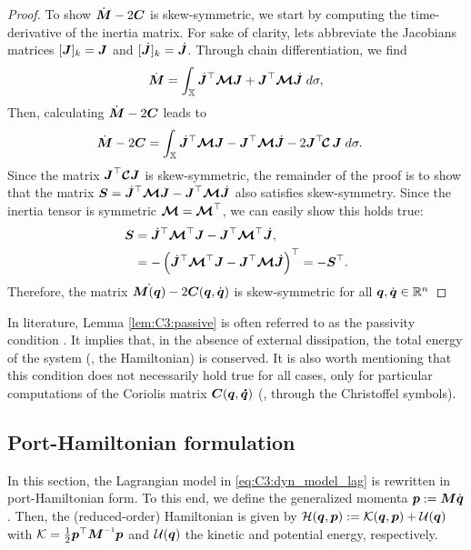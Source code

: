 \begin{proof}
To show $\dot{\boldsymbol{M}} - 2\boldsymbol{C}$ is skew-symmetric, we start by computing the time-derivative of the inertia matrix. For sake of clarity, lets abbreviate the Jacobians matrices $[\boldsymbol{J}]_k = \boldsymbol{J}$ and $[\,\,\dot{\!\!\boldsymbol{J}}]_k = \,\,\dot{\!\!\boldsymbol{J}}$. Through chain differentiation, we find
%
\begin{equation}
\dot{\boldsymbol{M}} = \int_{\mathbb{X}} \,\,\dot{\!\!\boldsymbol{J}}^\top \boldsymbol{\mathcal{M}} \boldsymbol{J} + \boldsymbol{J}^\top \boldsymbol{\mathcal{M}} \,\,\dot{\!\!\boldsymbol{J}}\; d \sigma,
\end{equation}
%
Then, calculating $\dot{\boldsymbol{M}} - 2\boldsymbol{C}$ leads to
%
\begin{align}
\dot{\boldsymbol{M}} - 2\boldsymbol{C} & = \int_{\mathbb{X}} \,\,\dot{\!\!\boldsymbol{J}}^\top \boldsymbol{\mathcal{M}} \boldsymbol{J} - \boldsymbol{J}^\top \boldsymbol{\mathcal{M}} \,\,\dot{\!\!\boldsymbol{J}} - 2\boldsymbol{J}^\top \!\boldsymbol{\mathcal{C}} \, \boldsymbol{J} \; d\sigma.
\end{align}
%
Since the matrix $\boldsymbol{J}^\top \boldsymbol{\mathcal{C}} \boldsymbol{J}$ is skew-symmetric, the remainder of the proof is to show that the matrix $\boldsymbol{S} = \,\,\dot{\!\!\boldsymbol{J}}^\top \boldsymbol{\mathcal{M}} \boldsymbol{J} - \boldsymbol{J}^\top \boldsymbol{\mathcal{M}} \,\,\dot{\!\!\boldsymbol{J}}$ also satisfies skew-symmetry. Since the inertia tensor is symmetric $\boldsymbol{\mathcal{M}} = \boldsymbol{\mathcal{M}}^\top
$, we can easily show this holds true:
%
\begin{align}
\mat{S} & = \dJB^\top \MT^\top \mat{J} - \mat{J}^\top \MT^\top \dJB, \notag \\
 & = -\left(\dJB^\top \ten{M}^\top \mat{J} - \mat{J}^\top \ten{M} \dJB \right)^\top = -\mat{S}^\top.
\end{align}
%
Therefore, the matrix $\dot{\boldsymbol{M}(\boldsymbol{q})} - 2\boldsymbol{C}(\boldsymbol{q},\dot{\boldsymbol{q}})$ is skew-symmetric for all $\boldsymbol{q},\dot{\boldsymbol{q}} \in \mathbb{R}^n$
\end{proof}

In literature, Lemma \ref{lem:C3:passive} is often referred to as the passivity condition \cite{Spong2006,Ortega1998,Murray1994}. It implies that, in the absence of external dissipation, the total energy of the system (\ie, the Hamiltonian) is conserved. It is also worth mentioning that this condition does not necessarily hold true for all cases, only for particular computations of the Coriolis matrix $\boldsymbol{C}(\boldsymbol{q},\boldsymbol{\dot{q}})$ (\eg, through the Christoffel symbols).

\subsection{Port-Hamiltonian formulation}
In this section, the Lagrangian model in \eqref{eq:C3:dyn_model_lag} is rewritten in port-Hamiltonian form. To this end, we define the generalized momenta $\boldsymbol{p} := \boldsymbol{M} \dot{\boldsymbol{q}}$. Then, the (reduced-order) Hamiltonian is given by
$\mathcal{H}(\boldsymbol{q},\boldsymbol{p}) := \mathcal{K}(\boldsymbol{q},\boldsymbol{p}) + \mathcal{U}(\boldsymbol{q})$ with $\Kf = \frac{1}{2} \vec{p}^\top \mat{M}\inv \vec{p}$ and $\mathcal{U}(\boldsymbol{q})$ the kinetic and potential energy, respectively.

